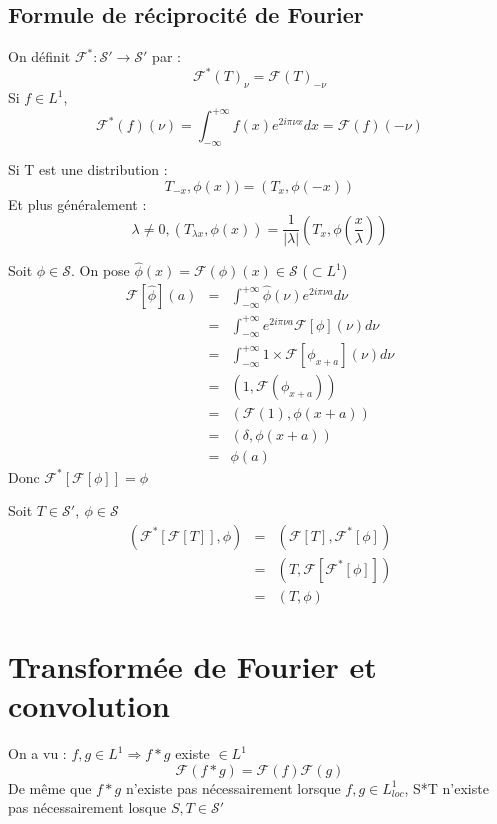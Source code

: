 \documentclass{article}
\begin{document}
\subsection{Formule de réciprocité de Fourier}
On définit $\mathcal{F}^* : \mathcal{S}' \to \mathcal{S}'$ par : 
\[\mathcal{F}^*(T)_{\nu}=\mathcal{F}(T)_{-\nu}\]
Si $f\in L^1$, \[\mathcal{F}^*(f)(\nu)=\int_{-\infty}^{+\infty} f(x)e^{2i\pi\nu x} dx = \mathcal{F}(f)(-\nu)\]

Si T est une distribution : \[T_{-x},\phi(x)) = (T_x,\phi(-x))\]
Et plus généralement : \[\lambda\neq 0, (T_{\lambda x}, \phi(x)) = \frac{1}{|\lambda|} \left(T_x,\phi\left(\frac{x}{\lambda}\right)\right)\]



\begin{dem}
Soit $\phi\in\mathcal{S}$. On pose $\hat{\phi}(x)=\mathcal{F}(\phi)(x) \in \mathcal{S}$ ($\subset L^1$) 
\begin{eqnarray*}
\mathcal{F}[\hat{\phi}](a) &=& \int_{-\infty}^{+\infty} \hat{\phi}(\nu) e^{2i\pi\nu a} d\nu \\
			&=& \int_{-\infty}^{+\infty} e^{2i\pi\nu a} \mathcal{F}[\phi](\nu) d\nu \\
			&=& \int_{-\infty}^{+\infty} 1\times \mathcal{F}[\phi_{x+a}] (\nu) d\nu \\
			&=& (1,\mathcal{F}(\phi_{x+a})) \\
			&=& (\mathcal{F}(1),\phi(x+a)) \\
			&=& (\delta,\phi(x+a)) \\
			&=& \phi(a)
\end{eqnarray*}
Donc $\mathcal{F}^*[\mathcal{F}[\phi]] = \phi$

\bigskip
Soit $T\in\mathcal{S}',\ \phi\in \mathcal{S}$
\begin{eqnarray*}
(\mathcal{F}^*[\mathcal{F}[T]],\phi) &=& (\mathcal{F}[T],\mathcal{F}^*[\phi]) \\
				&=& (T,\mathcal{F}[\mathcal{F}^*[\phi]]) \\
				&=& (T,\phi)
\end{eqnarray*}
\end{dem}

\section{Transformée de Fourier et convolution}
On a vu : $f,g \in L^1 \Rightarrow f*g$ existe $\in L^1$ 
\[\mathcal{F}(f*g)=\mathcal{F}(f)\mathcal{F}(g)\]
De même que $f*g$ n'existe pas nécessairement lorsque $f,g\in L^1_{loc}$, S*T n'existe pas nécessairement losque $S,T\in\mathcal{S}'$
\end{document}

